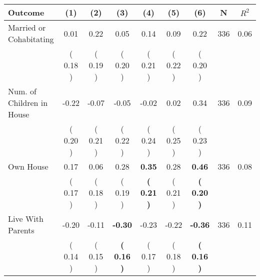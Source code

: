\begin{tabular}{lcccccccc}
\toprule
 \textbf{Outcome} & \textbf{(1)} & \textbf{(2)} & \textbf{(3)} & \textbf{(4)} & \textbf{(5)} & \textbf{(6)} & \textbf{N} & \textbf{$ R^2$} \\
\midrule
Married or Cohabitating &      0.01 &      0.22 &      0.05 &      0.14 &      0.09 &      0.22 & 336 &       0.06 \\ 
 & (     0.18 ) & (     0.19 ) & (     0.20 ) & (     0.21 ) & (     0.22 ) & (     0.20 ) & \\
Num. of Children in House &     -0.22 &     -0.07 &     -0.05 &     -0.02 &      0.02 &      0.34 & 336 &       0.09 \\ 
 & (     0.20 ) & (     0.21 ) & (     0.22 ) & (     0.24 ) & (     0.25 ) & (     0.23 ) & \\
Own House &      0.17 &      0.06 &      0.28 & \textbf{     0.35} &      0.28 & \textbf{     0.46} & 336 &       0.08 \\ 
 & (     0.17 ) & (     0.18 ) & (     0.19 ) & \textbf{(     0.21 )} & (     0.21 ) & \textbf{(     0.20 )} & \\
Live With Parents &     -0.20 &     -0.11 & \textbf{    -0.30} &     -0.23 &     -0.22 & \textbf{    -0.36} & 336 &       0.11 \\ 
 & (     0.14 ) & (     0.15 ) & \textbf{(     0.16 )} & (     0.17 ) & (     0.18 ) & \textbf{(     0.16 )} & \\
\bottomrule
\end{tabular}
